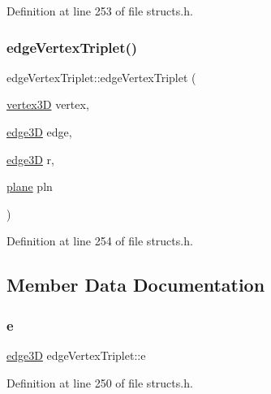 Definition at line 253 of file structs.\+h.

\mbox{\label{structedge_vertex_triplet_a50dd657c672509d29a3dff67559c8f6b}} 
\subsubsection{\texorpdfstring{edge\+Vertex\+Triplet()}{edgeVertexTriplet()}\hspace{0.1cm}{\footnotesize\ttfamily [2/2]}}
{\footnotesize\ttfamily edge\+Vertex\+Triplet\+::edge\+Vertex\+Triplet (\begin{DoxyParamCaption}\item[{\mbox{\hyperlink{structvertex3_d}{vertex3D}}}]{vertex,  }\item[{\mbox{\hyperlink{structedge3_d}{edge3D}}}]{edge,  }\item[{\mbox{\hyperlink{structedge3_d}{edge3D}}}]{r,  }\item[{\mbox{\hyperlink{structplane}{plane}}}]{pln }\end{DoxyParamCaption})\hspace{0.3cm}{\ttfamily [inline]}}



Definition at line 254 of file structs.\+h.



\subsection{Member Data Documentation}
\mbox{\label{structedge_vertex_triplet_a9ccfd63a20315a1aebb2c4d873e3c045}} 
\subsubsection{\texorpdfstring{e}{e}}
{\footnotesize\ttfamily \mbox{\hyperlink{structedge3_d}{edge3D}} edge\+Vertex\+Triplet\+::e}



Definition at line 250 of file structs.\+h.

\mbox{\label{structedge_vertex_triplet_a6d523c5de722cb420c3515594be8fc0e}} 
